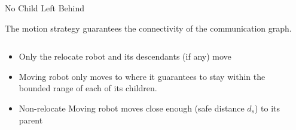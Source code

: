 \begin{frame}{No Child Left Behind}
  \begin{theorem}
   The motion strategy guarantees the connectivity of the communication graph.
  \end{theorem}
  \begin{columns}[T] %
    \begin{column}{.45\textwidth}
      \begin{itemize}
      \item Only the relocate robot and its descendants (if any) move
      \item Moving robot only moves to where it guarantees to stay within the bounded range of each of its children.
      \item Non-relocate Moving robot moves close enough (safe distance $d_s$) to its parent 
      \end{itemize}
    \end{column}%
    \begin{column}{.45\textwidth}
      \only<1>{
        
      }
    \end{column}%
  \end{columns}
\end{frame}